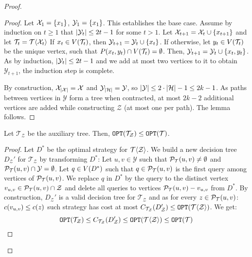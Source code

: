 \begin{theorem}
\begin{proof}
\begin{lemma}
\begin{proof}
        Let $\mathcal{X}_1=\mathopen{}\left\{ x_1 \right\}$, $\mathcal{Y}_1=\mathopen{}\left\{ x_1 \right\}$. This establishes the base case. Assume by induction on $t\geq1$ that $\mathopen{}\left| \mathcal{Y}_t \right|\leq 2t-1$ for some $t>1$. Let $\mathcal{X}_{t+1} =\mathcal{X}_{t}\cup \mathopen{}\left\{ x_{t+1} \right\}$ and let $\mathcal{T}_t=\mathcal{T}\mathopen{}\langle \mathcal{X}_{t} \rangle$ If $x_t\in V\mathopen{}\left( \mathcal{T}_t \right)$, then $\mathcal{Y}_{t+1}=\mathcal{Y}_{t}\cup \mathopen{}\left\{ x_t \right\}$. If otherwise, let $y_t \in V\mathopen{}\left( \mathcal{T}_t \right)$ be the unique vertex, such that $P\mathopen{}\left( x_t, y_t \right)\cap V\mathopen{}\left( \mathcal{T}_t \right)=\emptyset$. Then, $\mathcal{Y}_{t+1}=\mathcal{Y}_{t}\cup \mathopen{}\left\{ x_t, y_t \right\}$. As by induction, $\mathopen{}\left| \mathcal{Y}_{t} \right|\leq 2t-1$ and we add at most two vertices to it to obtain $\mathcal{Y}_{t+1}$, the induction step is complete.
        
        By construction, $\mathcal{X}_{\mathopen{}\left| \mathcal{X} \right|}=\mathcal{X}$ and $\mathcal{Y}_{\mathopen{}\left| \mathcal{H} \right|}=\mathcal{Y}$, so $\mathopen{}\left| \mathcal{Y} \right| \leq 2\cdot \mathopen{}\left| \mathcal{H} \right| - 1 \leq 2k-1$.
        As paths between vertices in $\mathcal{Y}$ form a tree when contracted, at most $2k-2$ additional vertices are added while constructing $\mathcal{Z}$ (at most one per path). The lemma follows.
    \end{proof}
\end{lemma}
\begin{lemma}\label{lemma:auxTreeCost}
    Let $\mathcal{T}_{\mathcal{Z}}$ be the auxiliary tree. Then, $\texttt{OPT}\mathopen{}\left( \mathcal{T}_{\mathcal{Z}} \right)\leq \texttt{OPT}\mathopen{}\left( \mathcal{T} \right)$.
    \begin{proof}
        Let $D^*$ be the optimal strategy for $\mathcal{T}\mathopen{}\langle \mathcal{Z} \rangle$. We build a new decision tree $D_{\mathcal{Z}}'$ for $\mathcal{T}_{\mathcal{Z}}$ by transforming $D^*$: Let $u,v\in \mathcal{Y}$ such that $\mathcal{P}_{\mathcal{T}}\mathopen{}\left( u, v \right)\neq\emptyset$ and $\mathcal{P}_{\mathcal{T}}\mathopen{}\left( u, v \right)\cap \mathcal{Y}=\emptyset$. Let $q\in V\mathopen{}\left( D^* \right)$ such that $q\in \mathcal{P}_{\mathcal{T}}\mathopen{}\left( u, v \right)$ is the first query among vertices of $\mathcal{P}_{\mathcal{T}}\mathopen{}\left( u, v \right)$. We replace $q$ in $D^*$ by the query to the distinct vertex $v_{u,v}\in \mathcal{P}_{\mathcal{T}}\mathopen{}\left( u, v \right)\cap \mathcal{Z}$ and delete all queries to vertices $\mathcal{P}_{\mathcal{T}}\mathopen{}\left( u, v \right)-v_{u,v}$ from $D^*$. By construction, $D_{\mathcal{Z}}'$ is a valid decision tree for $\mathcal{T}_{\mathcal{Z}}$ and as for every $z\in \mathcal{P}_{\mathcal{T}}\mathopen{}\left( u, v \right)$: $c\mathopen{}\left( v_{u,v} \right)\leq c\mathopen{}\left( z \right)$ such strategy has cost at most $C_{\mathcal{T}_{\mathcal{Z}}}\mathopen{}\left( D_{\mathcal{Z}}' \right)\leq \texttt{OPT}\mathopen{}\left( \mathcal{T}\mathopen{}\langle \mathcal{Z} \rangle \right)$. We get:
        $$
        \texttt{OPT}\mathopen{}\left( \mathcal{T}_{\mathcal{Z}} \right)\leq C_{\mathcal{T}_{\mathcal{Z}}}\mathopen{}\left( D_{\mathcal{Z}}' \right)\leq \texttt{OPT}\mathopen{}\left( \mathcal{T}\mathopen{}\langle \mathcal{Z} \rangle \right)\leq \texttt{OPT}\mathopen{}\left( \mathcal{T} \right)
        $$


\end{proof}
\end{lemma}
\end{proof}
\end{theorem}
